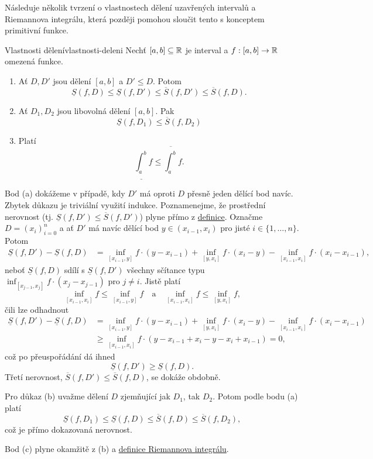 Následuje několik tvrzení o vlastnostech dělení uzavřených intervalů a
Riemannova integrálu, která později pomohou sloučit tento s konceptem primitivní
funkce.

\begin{lemma}{Vlastnosti dělení}{vlastnosti-deleni}
 Nechť $[a,b] \subseteq \mathbb{R}$ je interval a $f:[a,b] \to \mathbb{R}$ omezená funkce.
 \begin{enumerate}[label=(\alph*),topsep=0pt]
	\item Ať $D,D'$ jsou dělení $[a,b]$ a $D' \leq D$. Potom
	\[
	 \underline{S}(f,D) \leq \underline{S}(f,D') \leq \overline{S}(f,D') \leq
	 \overline{S}(f,D).
	\]
 	\item Ať $D_1,D_2$ jsou libovolná dělení $[a,b]$. Pak
 	\[
   \underline{S}(f,D_1) \leq \overline{S}(f,D_2)
 	\]
 	\item Platí
 	\[
	 \underline{\int_{a}^{b}} f \leq \overline{\int_{a}^{b}} f.
 	\]
 \end{enumerate}
\end{lemma}
\begin{lemproof}
 Bod (a) dokážeme v případě, kdy $D'$ má oproti $D$ přesně jeden dělící bod
 navíc. Zbytek důkazu je triviální využití indukce. Poznamenejme, že prostřední
 nerovnost (tj. $\underline{S}(f,D') \leq \overline{S}(f,D')$) plyne přímo z
 \hyperref[def:horni-a-dolni-soucty]{definice}. Označme $D = (x_i)_{i=0}^{n}$ a
 ať $D'$ má navíc dělící bod ${y \in (x_{i-1},x_i)}$ pro jisté $i \in
 \{1,\ldots,n\}$. Potom
 \begin{align*}
  \underline{S}(f,D') - \underline{S}(f,D) &= \inf_{[x_{i-1},y]} f \cdot (y -
  x_{i-1}) + \inf_{[y,x_i]} f \cdot (x_i - y) - \inf_{[x_{i-1},x_i]} f \cdot
  (x_i - x_{i-1}),
 \end{align*}
 neboť $\underline{S}(f,D)$ sdílí s $\underline{S}(f,D')$ všechny sčítance typu
 $\inf_{[x_{j-1},x_j]} f \cdot (x_j - x_{j-1})$ pro $j \neq i$. Jistě platí
 \[
  \inf_{[x_{i-1},x_i]} f \leq \inf_{[x_{i-1},y]} f \quad \text{a} \quad
  \inf_{[x_{i-1},x_i]} f \leq \inf_{[y,x_i]} f,
 \]
 čili lze odhadnout
 \begin{align*}
  \underline{S}(f,D') - \underline{S}(f,D) &= \inf_{[x_{i-1},y]} f \cdot (y -
  x_{i-1}) + \inf_{[y,x_i]} f \cdot (x_i - y) - \inf_{[x_{i-1},x_i]} f \cdot
  (x_i - x_{i-1})\\
  																				 & \geq \inf_{[x_{i-1},x_i]} f \cdot
  																				 (y - x_{i-1} + x_i - y - x_i +
  																				 x_{i-1}) = 0,
 \end{align*}
 což po přeuspořádání dá ihned
 \[
  \underline{S}(f,D') \geq \underline{S}(f,D).
 \]
 Třetí nerovnost, $\overline{S}(f,D') \leq \overline{S}(f,D)$, se dokáže
 obdobně.

 Pro důkaz (b) uvažme dělení $D$ zjemňující jak $D_1$, tak $D_2$. Potom podle
 bodu (a) platí
 \[
  \underline{S}(f,D_1) \leq \underline{S}(f,D) \leq \overline{S}(f,D) \leq
  \overline{S}(f,D_2),
 \]
 což je přímo dokazovaná nerovnost.

 Bod (c) plyne okamžitě z (b) a \hyperref[def:riemannuv-integral]{definice
 Riemannova integrálu}.
\end{lemproof}

